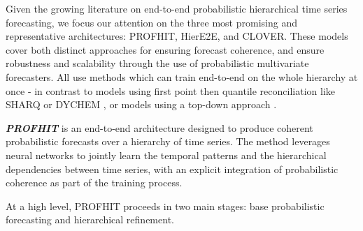 \documentclass[letterpaper]{article}
\begin{document}
Given the growing literature on end-to-end probabilistic hierarchical time series forecasting, we focus our attention on the three most promising and representative architectures: PROFHIT, HierE2E, and CLOVER. 
These models cover both distinct approaches for ensuring forecast coherence, and ensure robustness and scalability through the use of probabilistic multivariate forecasters.
All use methods which can train end-to-end on the whole hierarchy at once - in contrast to models using first point then quantile reconciliation like SHARQ or DYCHEM \cite{SHARQ}, \cite{DYCHEM} or models using a top-down approach \cite{Dirichlet}.

\textit{\textbf{PROFHIT}} is an end-to-end architecture designed to produce coherent probabilistic forecasts over a hierarchy of time series. 
The method leverages neural networks to jointly learn the temporal patterns and the hierarchical dependencies between time series, with an explicit integration of probabilistic coherence as part of the training process.

At a high level, PROFHIT proceeds in two main stages: base probabilistic forecasting and hierarchical refinement.
\end{document}
